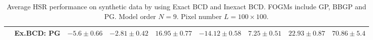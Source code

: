 \begin{table}[h]
{\begin{tabular}{|c|c|c|c|c|c|c|c|c|}
                    & Ex.BCD:  PG   &                   {$-5.6\pm 0.66$}  &                   {$-2.81\pm 0.42$} &                   {$16.95\pm 0.77$} &                   {$-14.12\pm 0.58$} &                   {$7.25\pm 0.51$} &                   {$22.93\pm 0.87$} & $70.86    \pm 5.4$    \tabularnewline \hline
\end{tabular}
}
\caption{Average HSR performance on synthetic data by using Exact BCD and
         Inexact BCD. FOGMs include GP, BBGP and PG. Model order $N = 9$.
         Pixel number $L = 100 \times 100$.}
\label{table:ALGO_1_vs_100_it_SYNT_MO9}
\end{table}

